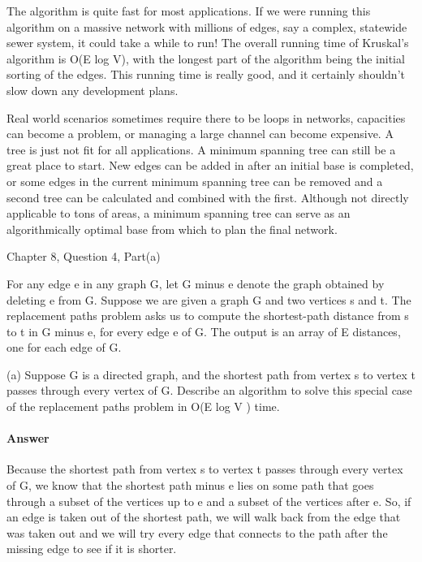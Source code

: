 \documentclass{article}
\begin{document}
The algorithm is quite fast for most applications. If we were running this algorithm on a massive network with millions of edges, say a complex, statewide sewer system, it could take a while to run! The overall running time of Kruskal’s algorithm is O(E log V), with the longest part of the algorithm being the initial sorting of the edges. This running time is really good, and it certainly shouldn’t slow down any development plans.

Real world scenarios sometimes require there to be loops in networks, capacities can become a problem, or managing a large channel can become expensive. A tree is just not fit for all applications. A minimum spanning tree can still be a great place to start. New edges can be added in after an initial base is completed, or some edges in the current minimum spanning tree can be removed and a second tree can be calculated and combined with the first. Although not directly applicable to tons of areas, a minimum spanning tree can serve as an algorithmically optimal base from which to plan the final network.


\collab{\todo{}}

Chapter 8, Question 4, Part(a)

For any edge e in any graph G, let G minus e denote the graph obtained by
deleting e from G. Suppose we are given a graph G and two vertices s
and t. The replacement paths problem asks us to compute the shortest-path
distance from s to t in G minus e, for every edge e of G. The output is an array
of E distances, one for each edge of G.

(a) Suppose G is a directed graph, and the shortest path from vertex s to
vertex t passes through every vertex of G. Describe an algorithm to solve
this special case of the replacement paths problem in O(E log V ) time.

\paragraph{Answer}
Because the shortest path from vertex s to vertex t passes through every vertex
of G, we know that the shortest path minus e lies on some path that goes through
a subset of the vertices up to e and a subset of the vertices after e. So, if
an edge is taken out of the shortest path, we will walk back from the edge that was
taken out and we will try every edge that connects to the path after the missing
edge to see if it is shorter.
\end{document}
